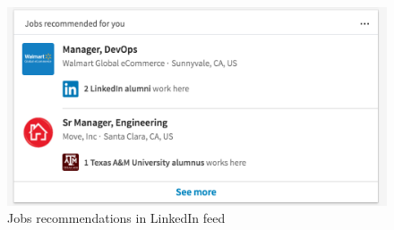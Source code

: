 \begin{figure}
\includegraphics[width=\linewidth,height=\textheight,keepaspectratio]{jymbii-in-feed.png}
\caption{Jobs recommendations in LinkedIn feed}
\label{fig:jymbii-in-feed}
\end{figure}
